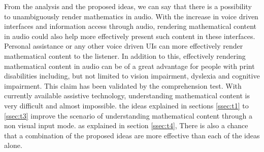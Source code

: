 \documentclass{article}
\begin{document}
From the analysis and the proposed ideas, we can say that there is a possibility to unambiguously render mathematics in audio. With the increase in voice driven interfaces and information access through audio, rendering mathematical content in audio could also help more effectively present such content in these interfaces. Personal assistance or any other voice driven UIs can more effectively render mathematical content to the listener. In addition to this, effectively rendering mathematical content in audio can be of a great advantage for people with print disabilities including, but not limited to vision  impairment, dyslexia and cognitive impairment. This claim has been validated by the comprehension test. With currently available assistive technology, understanding mathematical content is very difficult and almost impossible. the ideas explained in sections \ref{ssec:t1} to \ref{ssec:t3} improve the scenario  of understanding mathematical content through a non visual input mode. as explained in section \ref{ssec:t4}, There is also a chance that a combination of the proposed ideas are more effective than each of the ideas alone.






\end{document}
